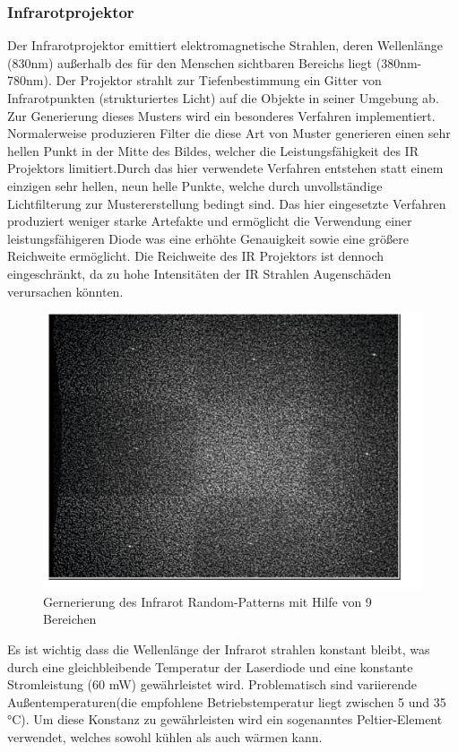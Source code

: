 \subsubsection{Infrarotprojektor}
Der Infrarotprojektor emittiert elektromagnetische Strahlen, deren Wellenlänge (830nm) außerhalb des für den Menschen sichtbaren Bereichs liegt (380nm-780nm).
Der Projektor strahlt zur Tiefenbestimmung ein Gitter von Infrarotpunkten (strukturiertes Licht) auf die Objekte in seiner Umgebung ab. 
Zur Generierung dieses Musters wird ein besonderes Verfahren implementiert.
Normalerweise produzieren Filter die diese Art von Muster generieren einen sehr hellen Punkt in der Mitte des Bildes, welcher die Leistungsfähigkeit des IR Projektors limitiert.Durch das hier verwendete Verfahren entstehen statt einem einzigen sehr hellen, neun helle Punkte, welche durch unvollständige Lichtfilterung zur Mustererstellung bedingt sind. Das hier eingesetzte Verfahren produziert weniger starke Artefakte und ermöglicht die Verwendung einer leistungsfähigeren Diode was eine erhöhte Genauigkeit sowie eine größere Reichweite ermöglicht. Die Reichweite des IR Projektors ist dennoch eingeschränkt, da zu hohe Intensitäten der IR Strahlen Augenschäden verursachen könnten.
\begin{figure}
\centering
\includegraphics[width=0.5\linewidth]{./Res/9_Dots}
\caption{Gernerierung des Infrarot Random-Patterns mit Hilfe von 9 Bereichen}
\label{fig:9_Dots}
\end{figure}
\FloatBarrier
Es ist wichtig dass die Wellenlänge der Infrarot strahlen konstant bleibt, was durch eine gleichbleibende Temperatur der Laserdiode und eine konstante Stromleistung (60 mW) gewährleistet wird. Problematisch sind variierende Außentemperaturen(die empfohlene Betriebstemperatur  liegt zwischen 5 und 35 °C). Um diese Konstanz zu gewährleisten wird ein sogenanntes  Peltier-Element verwendet, welches sowohl kühlen als auch wärmen kann.\\

